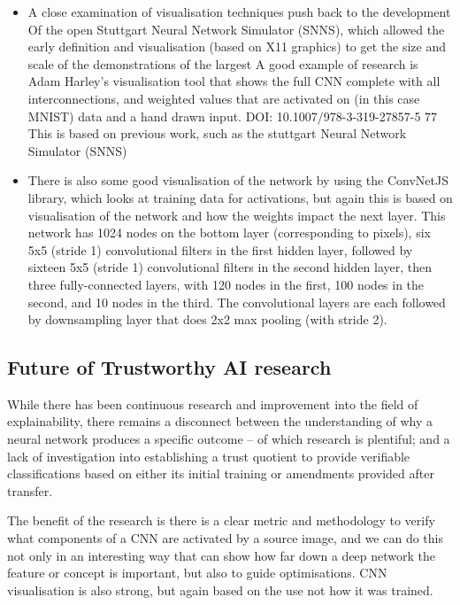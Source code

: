 \begin{itemize}
    \item A close examination of visualisation techniques push back to the development Of the open Stuttgart Neural Network Simulator (SNNS), which allowed the early definition and visualisation (based on X11 graphics) to get the size and scale of the demonstrations of the largest A good example of research is Adam Harley's visualisation tool \cite{li_visualizing_2018} that shows the full CNN complete with all interconnections, and weighted values that are activated on (in this case MNIST) data and a hand drawn input. DOI: 10.1007/978-3-319-27857-5 77  This is based on previous work, such as the stuttgart Neural Network Simulator (SNNS) 
    \item There is also some good visualisation of the network by using the ConvNetJS library, which looks at training data for activations, but again this is based on visualisation of the network and how the weights impact the next layer. This network has 1024 nodes on the bottom layer (corresponding to pixels), six 5x5 (stride 1) convolutional filters in the first hidden layer, followed by sixteen 5x5 (stride 1) convolutional filters in the second hidden layer, then three fully-connected layers, with 120 nodes in the first, 100 nodes in the second, and 10 nodes in the third. The convolutional layers are each followed by downsampling layer that does 2x2 max pooling (with stride 2). 
\end{itemize}


\subsection{Future of Trustworthy AI research}
While there has been continuous research and improvement into the field of explainability, there remains a disconnect between the understanding of why a neural network produces a specific outcome – of which research is plentiful; and a lack of investigation into establishing a trust quotient to provide verifiable classifications based on either its initial training or amendments provided after transfer.

The benefit of the research is there is a clear metric and methodology to verify what components of a CNN are activated by a source image, and we can do this not only in an interesting way that can show how far down a deep network the feature or concept is important, but also to guide optimisations. CNN visualisation is also strong, but again based on the use not how it was trained.

